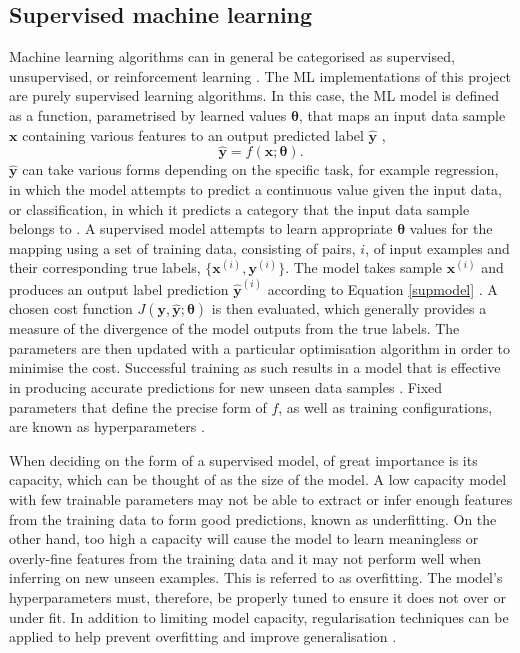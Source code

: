 \documentclass[12pt]{article}
\begin{document}
\subsection{Supervised machine learning}
Machine learning algorithms can in general be categorised as supervised, unsupervised, or reinforcement learning \cite{Murphy12}. The ML implementations of this project are purely supervised learning algorithms. In this case, the ML model is defined as a function, parametrised by learned values $\bm{\theta}$, that maps an input data sample $\bm{x}$ containing various features to an output predicted label $\hat{\bm{y}}$ \cite{Murphy12},
\begin{equation}
\hat{\bm{y}}=f(\bm{x};\bm{\theta}). \label{supmodel} 
\end{equation}
$\hat{\bm{y}}$ can take various forms depending on the specific task, for example regression, in which the model attempts to predict a continuous value given the input data, or classification, in which it predicts a category that the input data sample belongs to \cite{Murphy12}. A supervised model attempts to learn appropriate $\bm{\theta}$ values for the mapping using a set of training data, consisting of pairs, $i$, of input examples and their corresponding true labels, $\lbrace\bm{x}^{(i)},\bm{y}^{(i)}\rbrace$. The model takes sample $\bm{x}^{(i)}$ and produces an output label prediction $\hat{\bm{y}}^{(i)}$ according to Equation \ref{supmodel} \cite{Murphy12}. A chosen cost function $J(\bm{y},\hat{\bm{y}};\bm{\theta})$ is then evaluated, which generally provides a measure of the divergence of the model outputs from the true labels. The parameters are then updated with a particular optimisation algorithm in order to minimise the cost. Successful training as such results in a model that is effective in producing accurate predictions for new unseen data samples \cite{Murphy12, Goodfellow16}. Fixed parameters that define the precise form of $f$, as well as training configurations, are known as hyperparameters \cite{Murphy12, Goodfellow16}.

When deciding on the form of a supervised model, of great importance is its capacity, which can be thought of as the size of the model. A low capacity model with few trainable parameters may not be able to extract or infer enough features from the training data to form good predictions, known as underfitting. On the other hand, too high a capacity will cause the model to learn meaningless or overly-fine features from the training data and it may not perform well when inferring on new unseen examples. This is referred to as overfitting. The model's hyperparameters must, therefore, be properly tuned to ensure it does not over or under fit. In addition to limiting model capacity, regularisation techniques can be applied to help prevent overfitting and improve generalisation \cite{Murphy12, Goodfellow16}.
\end{document}
